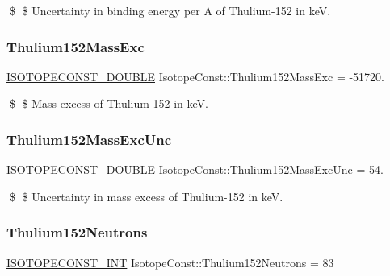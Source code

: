 \$ \$ Uncertainty in binding energy per A of Thulium-\/152 in keV. \mbox{\label{group___isotope_const-_thulium-_tm152_ga6cc36521b25834a93e03f24454d5c7a0}} 
\subsubsection{\texorpdfstring{Thulium152\+Mass\+Exc}{Thulium152MassExc}}
{\footnotesize\ttfamily \mbox{\hyperlink{group___isotope_const-_macros_ga8f45a7272ce02c0b4c65c44636ed719a}{I\+S\+O\+T\+O\+P\+E\+C\+O\+N\+S\+T\+\_\+\+D\+O\+U\+B\+LE}} Isotope\+Const\+::\+Thulium152\+Mass\+Exc = -\/51720.}

\$ \$ Mass excess of Thulium-\/152 in keV. \mbox{\label{group___isotope_const-_thulium-_tm152_gacec5f483f51274a3f6762fcdd9af79bf}} 
\subsubsection{\texorpdfstring{Thulium152\+Mass\+Exc\+Unc}{Thulium152MassExcUnc}}
{\footnotesize\ttfamily \mbox{\hyperlink{group___isotope_const-_macros_ga8f45a7272ce02c0b4c65c44636ed719a}{I\+S\+O\+T\+O\+P\+E\+C\+O\+N\+S\+T\+\_\+\+D\+O\+U\+B\+LE}} Isotope\+Const\+::\+Thulium152\+Mass\+Exc\+Unc = 54.}

\$ \$ Uncertainty in mass excess of Thulium-\/152 in keV. \mbox{\label{group___isotope_const-_thulium-_tm152_ga2b6aa32e94ee3117d59bcdcaf9e8cc8f}} 
\subsubsection{\texorpdfstring{Thulium152\+Neutrons}{Thulium152Neutrons}}
{\footnotesize\ttfamily \mbox{\hyperlink{group___isotope_const-_macros_ga5f18360b3e99483a35c32d789e62621c}{I\+S\+O\+T\+O\+P\+E\+C\+O\+N\+S\+T\+\_\+\+I\+NT}} Isotope\+Const\+::\+Thulium152\+Neutrons = 83}

